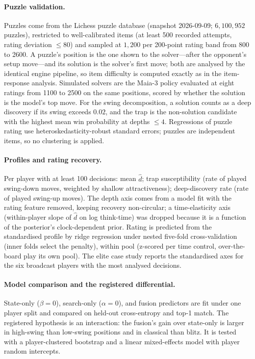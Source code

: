 \paragraph{Puzzle validation.}
Puzzles come from the Lichess puzzle database (snapshot 2026-09-09; $6{,}100{,}952$ puzzles),
restricted to well-calibrated items (at least 500 recorded attempts, rating deviation
$\le80$) and sampled at $1{,}200$ per 200-point rating band from 800 to 2600. A puzzle's
position is the one shown to the solver---after the opponent's setup move---and its solution
is the solver's first move; both are analysed by the identical engine pipeline, so item
difficulty is computed exactly as in the item-response analysis. Simulated solvers are the
Maia-3 policy evaluated at eight ratings from 1100 to 2500 on the same positions, scored by
whether the solution is the model's top move. For the swing decomposition, a solution counts as
a deep discovery if its swing exceeds $0.02$, and the trap is the non-solution candidate with
the highest mean win probability at depths $\le4$. Regressions of puzzle rating use
heteroskedasticity-robust standard errors; puzzles are independent items, so no clustering is
applied.

\paragraph{Profiles and rating recovery.}
Per player with at least 100 decisions: mean $\hat d$; trap susceptibility (rate of played
swing-down moves, weighted by shallow attractiveness); deep-discovery rate (rate of played
swing-up moves). The depth axis comes from a model fit with the rating feature removed,
keeping recovery non-circular; a time-elasticity axis (within-player slope of $\hat d$ on log
think-time) was dropped because it is a function of the posterior's clock-dependent prior. Rating is predicted from the standardised profile by ridge regression under
nested five-fold cross-validation (inner folds select the penalty), within pool (z-scored per
time control, over-the-board play its own pool). The elite case study reports the
standardised axes for the six broadcast players with the most analysed decisions.

\paragraph{Model comparison and the registered differential.}
State-only ($\beta{=}0$), search-only ($\alpha{=}0$), and fusion predictors are fit under one
player split and compared on held-out cross-entropy and top-1 match. The registered
hypothesis is an interaction: the fusion's gain over state-only is larger in high-swing than
low-swing positions and in classical than blitz. It is tested with a player-clustered
bootstrap and a linear mixed-effects model with player random intercepts.


